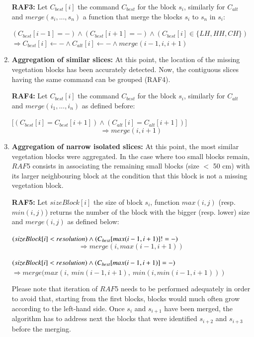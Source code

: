 \documentclass[preprint,3p,times,twocolumn]{elsarticle}
\begin{document}
\begin{enumerate}
\textbf{RAF3:} Let $C_{best} [i]$ the command $C_{best}$ for the block $s_i$, similarly for $C_{alt}$ and $merge(s_{i},...,s_{n})$ a function that merge the blocks $s_i$ to $s_n$ in $s_i$: \\
\begin{mdframed}
	$  (C_{best} [i-1] = -) \wedge (C_{best} [i + 1] = -) \wedge  (C_{best} [i] \in \{LH, HH, CH \})$ \\
	$  \Rightarrow C_{best} [i] \leftarrow - \wedge C_{alt} [i] \leftarrow - \wedge merge(i-1,i,i+1)$
\end{mdframed}
\item \textbf{Aggregation of similar slices:} At this point, the location of the missing vegetation blocks has been accurately detected. Now, the contiguous slices having the same command can be grouped (RAF4). 

\textbf{RAF4:} Let $C_{best} [i]$ the command $C_{best}$ for the block $s_i$, similarly for $C_{alt}$ and $merge(i_{1},...,i_{n})$ as defined before:
\begin{mdframed}
	$\big[ (C_{best} [i] = C_{best} [i+1]) \wedge (C_{alt} [i] = C_{alt} [i+1] ) \big]$ 
	\[\Rightarrow merge(i,i+1)
	\]
\end{mdframed}

\item \textbf{Aggregation of narrow isolated slices:}
At this point, the most similar vegetation blocks were aggregated. In the case where too small blocks remain, $RAF5$ consists in associating the remaining small blocks (size $<$ 50 cm) with its larger neighbouring block at the condition that this block is not a missing vegetation block. 

\textbf{RAF5:}
Let $sizeBlock[i]$ the size of block $s_i$, function $max(i,j)$ (resp. $min(i,j)$) returns the number of the block with the bigger (resp. lower) size and $merge(i,j)$ as defined below:
\begin{mdframed}
	$ (sizeBlock[i] < resolution)  \wedge \\(C_{best} [max(i-1,i+1)] != -) $
	\[ \Rightarrow merge(i,max(i-1,i+1)) \]
	
\end{mdframed}
\begin{mdframed}
	$   (sizeBlock[i] < resolution)  \wedge \\(C_{best} [max(i-1,i+1)] = -)  $
	$ \Rightarrow merge(max(i,\ min(i-1,i+1),\ min(i,min(i-1,i+1))
	)$
\end{mdframed}
Please note that iteration of $RAF5$ needs to be performed adequately in order to avoid that, starting from the first blocks, blocks would much often grow according to the left-hand side. Once $s_i$ and $s_{i+1}$ have been merged, the algorithm has to address next the blocks that were identified $s_{i+2}$ and $s_{i+3}$ before the merging. 

\end{enumerate}
\end{document}
